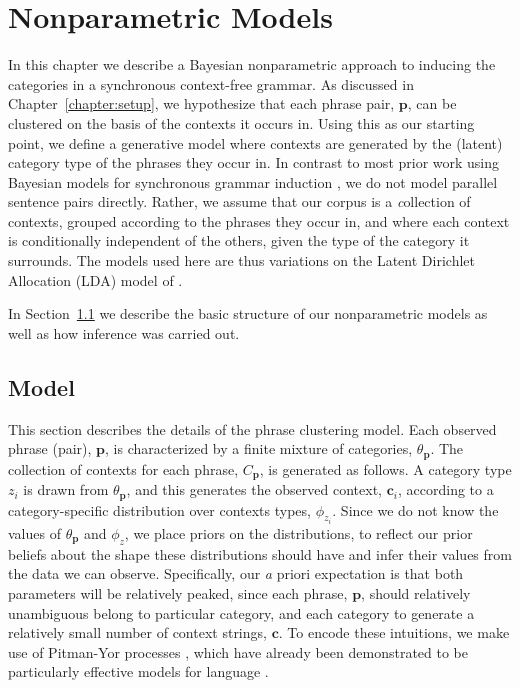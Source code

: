 
\newcommand{\p}{\textbf{p}}

\chapter{Nonparametric Models}

In this chapter we describe a Bayesian nonparametric approach to inducing the categories in a synchronous context-free grammar.  As discussed in Chapter~\ref{chapter:setup}, we hypothesize that each phrase pair, $\p$, can be clustered on the basis of the contexts it occurs in.  Using this as our starting point, we define a generative model where contexts are generated by the (latent) category type of the phrases they occur in.  In contrast to most prior work using Bayesian models for synchronous grammar induction \citep{blunsom:nips2008,blunsom:acl2009,zhang:2008}, we do not model parallel sentence pairs directly.  Rather, we assume that our corpus is a {\emph collection of contexts}, grouped according to the phrases they occur in, and where each context is conditionally independent of the others, given the type of the category it surrounds.  The models used here are thus variations on the Latent Dirichlet Allocation (LDA) model of \cite{blei:2003}.

In Section~\ref{sec:npmodel} we describe the basic structure of our nonparametric models as well as how inference was carried out.

\section{Model}
\label{sec:npmodel}

This section describes the details of the phrase clustering model.  Each observed phrase (pair), $\p$, is characterized by a finite mixture of categories, $\theta_{\p}$.  The collection of contexts for each phrase, $C_{\p}$, is generated as follows.  A category type $z_i$ is drawn from $\theta_{\p}$, and this generates the observed context, $\textbf{c}_i$, according to a category-specific distribution over contexts types, $\phi_{z_i}$.  Since we do not know the values of $\theta_{\p}$ and $\phi_z$, we place priors on the distributions, to reflect our prior beliefs about the shape these distributions should have and infer their values from the data we can observe.  Specifically, our {\emph a priori} expectation is that both parameters will be relatively peaked, since each phrase, $\p$, should relatively unambiguous belong to particular category, and each category to generate a relatively small number of context strings, $\textbf{c}$. To encode these intuitions, we make use of Pitman-Yor processes \citep{pitman:1997}, which have already been demonstrated to be particularly effective models for language \citep{teh:2006,goldwater:2006}.

